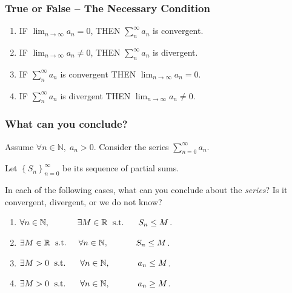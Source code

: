 \documentclass[14pt]{beamer}
\newcommand{\R}{\mathbb{R}}
\newcommand{\N}{\mathbb{N}}
\newcommand{\setsize}[1]{\fontsize{#1}{#1}\selectfont} %
\newcommand{\smallerfont}{\setsize{13}} %
\newcommand{\vv}{\vspace{.5cm}}
\begin{document}
	\begin{frame}[t]
		\frametitle{True or False -- The Necessary Condition}

		\begin{enumerate}
			\item IF ${\displaystyle \lim_{n \to \infty} a_n = 0}$, \quad THEN
				${\displaystyle \sum_{n}^{\infty} a_n}$ is convergent.
				\vfill

			\item IF ${\displaystyle \lim_{n \to \infty} a_n \neq 0}$, \quad THEN
				${\displaystyle \sum_{n}^{\infty} a_n}$ is divergent.
				\vfill

			\item IF ${\displaystyle \sum_{n}^{\infty} a_n}$ is convergent \quad THEN ${\displaystyle \lim_{n \to \infty} a_n = 0}$.
				\vfill

			\item IF ${\displaystyle \sum_{n}^{\infty} a_n}$ is divergent \quad THEN ${\displaystyle \lim_{n \to \infty} a_n \neq 0}$.
				\vfill
		\end{enumerate}
	\end{frame}
	\begin{frame}[t]
		\smallerfont
		\frametitle{What can you conclude?}

		Assume ${\displaystyle \forall n \in \N, \; a_n >0}$. Consider the series ${\displaystyle \sum_{n=0}^{\infty} a_n}$.

		Let ${\displaystyle \left\{ S_n \right\}_{n=0}^{\infty}}$ be its sequence of
		partial sums. \vv

		In each of the following cases, what can you conclude about the \emph{series}?
		Is it convergent, divergent, or we do not know? \vv

		\begin{enumerate}
			\item ${\displaystyle \forall n \in \N, \; \mbox{ \phantom{s.t.} } \quad \exists M \in \R \; \mbox{ s.t. } \; \quad S_n \leq M}$.

			\item ${\displaystyle \exists M \in \R \; \mbox{ s.t. } \quad \forall n \in \N, \; \mbox{ \phantom{s.t.} } \quad S_n \leq M}$.

			\item ${\displaystyle \exists M >0 \; \mbox{ s.t. } \; \quad \forall n \in \N, \; \mbox{ \phantom{s.t.} } \quad a_n \leq M}$.

			\item ${\displaystyle \exists M >0 \; \mbox{ s.t. } \; \quad \forall n \in \N, \; \mbox{ \phantom{s.t.} } \quad a_n \geq M}$.
		\end{enumerate}
	\end{frame}
\end{document}
